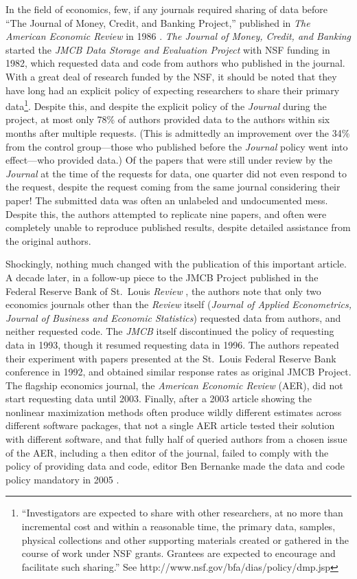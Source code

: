 \documentclass[12pt] {article}
\begin{document}
In the field of economics, few, if any journals required sharing of data
before ``The Journal of Money, Credit, and Banking Project,'' published
in \emph{The American Economic Review} in 1986 \citep{dewald_replication_1986}. \emph{The Journal of Money, Credit, and Banking} started
the \emph{JMCB Data Storage and Evaluation Project} with NSF funding in
1982, which requested data and code from authors who published in the
journal. With a great deal of research funded by the NSF, it should be
noted that they have long had an explicit policy of expecting
researchers to share their primary data\footnote{``Investigators are
  expected to share with other researchers, at no more than incremental
  cost and within a reasonable time, the primary data, samples, physical
  collections and other supporting materials created or gathered in the
  course of work under NSF grants. Grantees are expected to encourage
  and facilitate such sharing.'' See
  http://www.nsf.gov/bfa/dias/policy/dmp.jsp}. Despite this, and despite
the explicit policy of the \emph{Journal} during the project, at most
only 78\% of authors provided data to the authors within six months
after multiple requests. (This is admittedly an improvement over the
34\% from the control group---those who published before the
\emph{Journal} policy went into effect---who provided data.) Of the
papers that were still under review by the \emph{Journal} at the time of
the requests for data, one quarter did not even respond to the request,
despite the request coming from the same journal considering their
paper! The submitted data was often an unlabeled and undocumented mess.
Despite this, the authors attempted to replicate nine papers, and often
were completely unable to reproduce published results, despite detailed
assistance from the original authors.

Shockingly, nothing much changed with the publication of this important
article. A decade later, in a follow-up piece to the JMCB Project
published in the Federal Reserve Bank of St.~Louis \emph{Review}
\citep{anderson_replication_1994}, the authors note that only two economics
journals other than the \emph{Review} itself (\emph{Journal of Applied
Econometrics, Journal of Business and Economic Statistics}) requested
data from authors, and neither requested code. The \emph{JMCB} itself
discontinued the policy of requesting data in 1993, though it resumed
requesting data in 1996. The authors repeated their experiment with
papers presented at the St.~Louis Federal Reserve Bank conference in
1992, and obtained similar response rates as original JMCB Project. The
flagship economics journal, the \emph{American Economic Review} (AER),
did not start requesting data until 2003. Finally, after a 2003 article
showing the nonlinear maximization methods often produce wildly
different estimates across different software packages, that not a
single AER article tested their solution with different software, and
that fully half of queried authors from a chosen issue of the AER,
including a then editor of the journal, failed to comply with the policy
of providing data and code, editor Ben Bernanke made the data and code
policy mandatory in 2005 \citep{mccullough_verifying_2003, mccullough_got_2007}.
\end{document}
